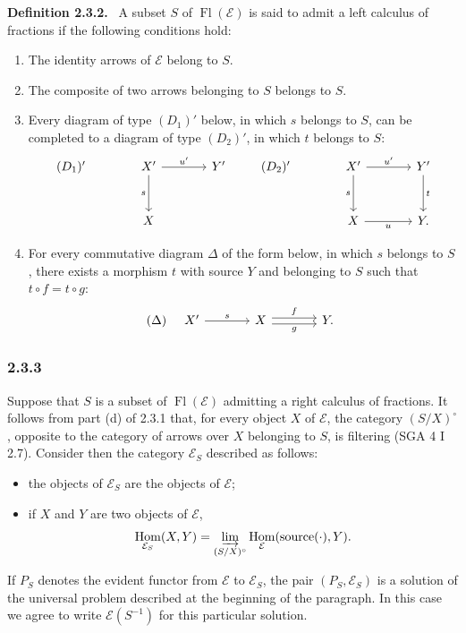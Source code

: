 \documentclass[11pt]{article}
\newenvironment{statement}[1]{\par\medskip\noindent\textbf{#1.}\ }{\par\medskip}
\DeclareMathOperator{\Hom}{Hom}
\providecommand{\Hom}{\operatorname{Hom}}
\providecommand{\Fl}{\operatorname{Fl}}
\providecommand{\cE}{\mathcal E}
\providecommand{\source}{\operatorname{source}}
\providecommand{\Hom}{\operatorname{Hom}}
\begin{document}
\begin{statement}{Definition 2.3.2}
A subset $S$ of $\Fl(\cE)$ is said to admit a left calculus of fractions if the following conditions hold:
\begin{enumerate}[label=(\alph*)]
\item[(a')] The identity arrows of $\cE$ belong to $S$.
\item[(b')] The composite of two arrows belonging to $S$ belongs to $S$.
\item[(c')] Every diagram of type $(D_1)'$ below, in which $s$ belongs to $S$, can be completed to a diagram of type $(D_2)'$, in which $t$ belongs to $S$:
\[
\begin{tikzcd}[column sep=large,row sep=large]
(D_1)'& X' \arrow[r,"u'"] \arrow[d,"s"'] & Y'\\
& X
\end{tikzcd}
\qquad
\begin{tikzcd}[column sep=large,row sep=large]
(D_2)'& X' \arrow[r,"u'"] \arrow[d,"s"'] & Y' \arrow[d,"t"]\\
& X \arrow[r,"u"'] & Y .
\end{tikzcd}
\]
\item[(d')] For every commutative diagram $\Delta$ of the form below, in which $s$ belongs to $S$, there exists a morphism $t$ with source $Y$ and belonging to $S$ such that $t\circ f=t\circ g$:
\[
(\Delta)\quad
\begin{tikzcd}[column sep=large]
X' \arrow[r,"s"] & X \arrow[r,shift left,"f"] \arrow[r,shift right,"g"'] & Y .
\end{tikzcd}
\]
\end{enumerate}
\end{statement}

\subsubsection*{2.3.3}
Suppose that $S$ is a subset of $\Fl(\cE)$ admitting a right calculus of fractions. It follows from part (d) of 2.3.1 that, for every object $X$ of $\cE$, the category $(S/X)^\circ$, opposite to the category of arrows over $X$ belonging to $S$, is filtering (SGA 4 I 2.7). Consider then the category $\cE_S$ described as follows:
\begin{itemize}
\item the objects of $\cE_S$ are the objects of $\cE$;
\item if $X$ and $Y$ are two objects of $\cE$,
\[
\Hom_{\cE_S}(X,Y)=\varinjlim_{(S/X)^\circ}\Hom_{\cE}(\source(\cdot),Y).
\]
\end{itemize}
If $P_S$ denotes the evident functor from $\cE$ to $\cE_S$, the pair $(P_S,\cE_S)$ is a solution of the universal problem described at the beginning of the paragraph. In this case we agree to write $\cE(S^{-1})$ for this particular solution.
\end{document}

